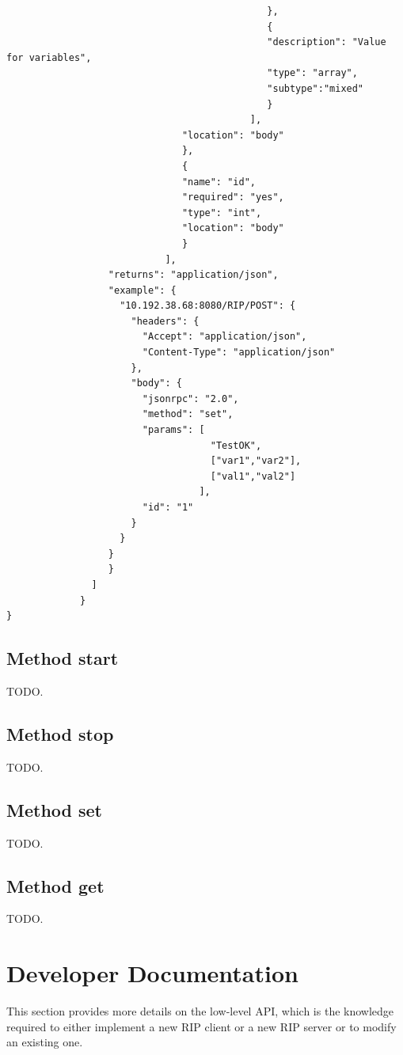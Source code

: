 \begin{lstlisting}
                                              },
                                              {
                                              "description": "Value for variables",
                                              "type": "array",
                                              "subtype":"mixed"
                                              }
                                           ],
                               "location": "body"
                               },
                               {
                               "name": "id",
                               "required": "yes",
                               "type": "int",
                               "location": "body"
                               }
                            ],
                  "returns": "application/json",
                  "example": {
                    "10.192.38.68:8080/RIP/POST": {
                      "headers": {
                        "Accept": "application/json",
                        "Content-Type": "application/json"
                      },
                      "body": {
                        "jsonrpc": "2.0",
                        "method": "set",
                        "params": [
                                    "TestOK",
                                    ["var1","var2"],
                                    ["val1","val2"]
                                  ],
                        "id": "1"
                      }
                    }
                  }
                  }
               ]
             }
}
\end{lstlisting}

\subsection{Method start}
TODO.

\subsection{Method stop}
TODO.

\subsection{Method set}
TODO.

\subsection{Method get}
TODO.

\section{Developer Documentation}
This section provides more details on the low-level API, which is the knowledge required to either implement a new RIP client or a new RIP server or to modify an existing one.

